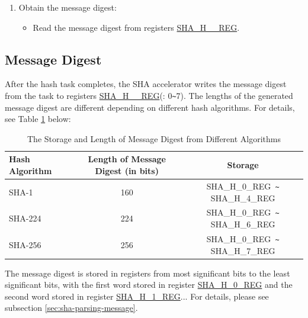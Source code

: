 \documentclass[main\_\_EN.tex]{subfiles}
\begin{document}
\begin{enumerate}
    \item Obtain the message digest:
    \begin{itemize}
        \item Read the message digest from registers \hyperref[regdesc:SHAHNREG]{SHA\_H\_\_REG}.
    \end{itemize}
\end{enumerate}

\subsection{Message Digest}

After the hash task completes, the SHA accelerator writes the message digest from the task to registers \hyperref[regdesc:SHAHNREG]{SHA\_H\_\_REG}(: 0\verb+~+7). The lengths of the generated message digest are different depending on different hash algorithms. For details, see Table \ref{tab:sha-message-digest} below:


\begin{table}[H]
    \centering
    \caption{The Storage and Length of Message Digest from Different Algorithms}
    \label{tab:sha-message-digest}
    \begin{threeparttable}
    \begin{tabular}{ | l | c | c |}
    \hline
        \rowcolor{lightgray}
        \textbf{Hash Algorithm} & \textbf{Length of Message Digest (in bits)} & \textbf{Storage\tnote{1}} \\\hline
        SHA-1 & 160 & SHA\_H\_0\_REG\verb+ ~ +SHA\_H\_4\_REG \\\hline
        SHA-224 & 224 & SHA\_H\_0\_REG\verb+ ~ +SHA\_H\_6\_REG \\\hline  
        SHA-256 & 256 & SHA\_H\_0\_REG\verb+ ~ +SHA\_H\_7\_REG \\\hline
    \end{tabular}

    \begin{tablenotes}
        \item[1] The message digest is stored in registers from most significant bits to the least significant bits, with the first word stored in register \hyperref[regdesc:SHAHNREG]{SHA\_H\_0\_REG} and the second word stored in register \hyperref[regdesc:SHAHNREG]{SHA\_H\_1\_REG}... For details, please see subsection \ref{sec:sha-parsing-message}.
    \end{tablenotes}

    \end{threeparttable}
\end{table}
\end{document}
